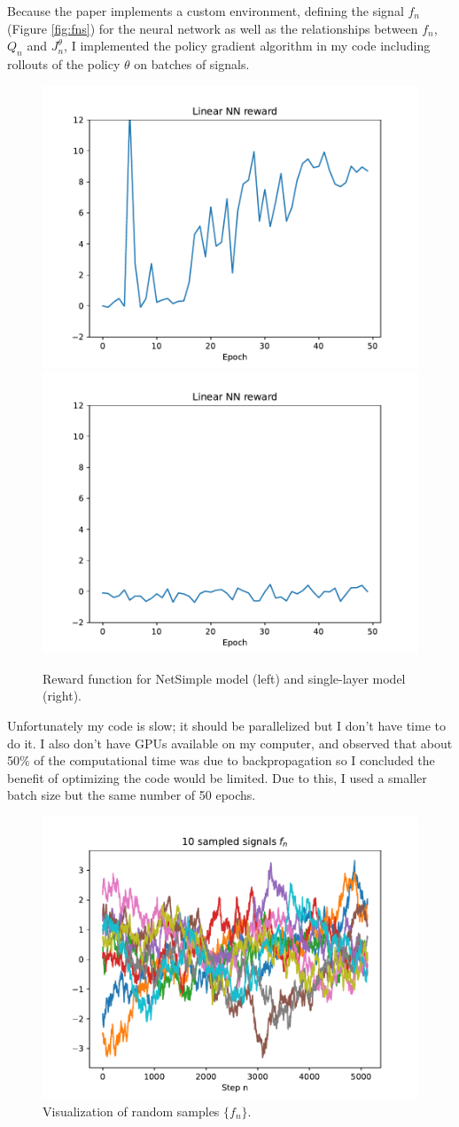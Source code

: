 \documentclass{article}
\begin{document}
	\par Because the paper implements a custom environment, defining the signal $f_n$ (Figure \ref{fig:fns}) for the neural network as well as the relationships between $f_n$, $Q_n$ and $J_n^\theta$, I implemented the policy gradient algorithm in my code including rollouts of the policy $\theta$ on batches of signals.
	\vspace{4em}

	\begin{figure}[t]
		\centering
		\includegraphics[width=0.49\linewidth]{figures/linear_training_reward.pdf}
		\includegraphics[width=0.49\linewidth]{figures/singlelayer.pdf}
		\caption{Reward function for NetSimple model (left) and single-layer model (right).}
		\label{fig:networks}
	\end{figure}
	
	
	Unfortunately my code is slow; it should be parallelized but I don't have time to do it. I also don't have GPUs available on my computer, and observed that about 50\% of the computational time was due to backpropagation so I concluded the benefit of optimizing the code would be limited.
	Due to this, I used a smaller batch size but the same number of 50 epochs.
	
	\begin{figure}[h]
		\centering
		\includegraphics[width=0.5\linewidth]{figures/f1_sample.pdf}
		\caption{Visualization of random samples $\{f_n\}.$}
	\end{figure}
	
\end{document}

